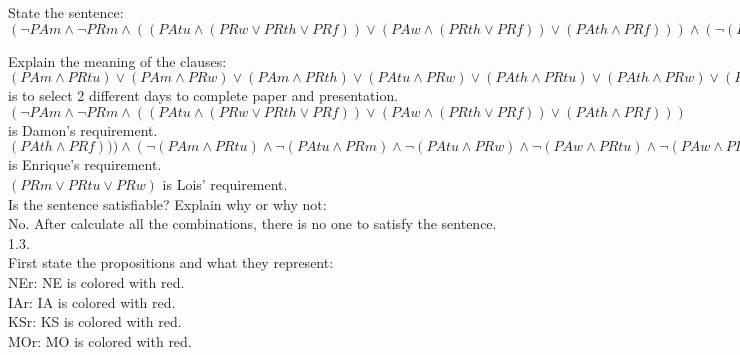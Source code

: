 \documentclass[a4paper]{article}
\begin{document}
State the sentence:\\
$(\neg PAm\wedge \neg PRm\wedge ((PAtu\wedge (PRw\vee PRth\vee PRf))\vee (PAw\wedge (PRth\vee PRf))\vee (PAth\wedge PRf)))\wedge (\neg (PAm\wedge PRtu)\wedge \neg (PAtu\wedge PRm)\wedge \neg (PAtu\wedge PRw)\wedge \neg (PAw\wedge PRtu)\wedge \neg (PAw\wedge PRth)\wedge \neg (PAth\wedge PRw)\wedge \neg (PAth\wedge PRf)\wedge \neg (PAf\wedge PRth))\wedge (PRm\vee PRtu\vee PRw) \wedge ((PAm \wedge PRtu)\vee (PAm \wedge PRw)\vee (PAm \wedge PRth)\vee (PAtu \wedge PRw)\vee (PAth \wedge PRtu)\vee (PAth \wedge PRw)\vee (PAf \wedge PRm)\vee (PAf \wedge PRtu)\vee (PAf \wedge PRw)\vee (PAf \wedge PRth)\vee (PRm \wedge PAtu)\vee (PRm \wedge PAw)\vee (PRm \wedge PAth)\vee (PRtu \wedge PAw)\vee (PRth \wedge PAtu)\vee (PRth \wedge PAw)\vee (PRf \wedge PAm)\vee (PRf \wedge PAtu)\vee (PRf \wedge PAw)\vee (PRf \wedge PAth))$

Explain the meaning of the clauses:\\
$(PAm \wedge PRtu)\vee (PAm \wedge PRw)\vee (PAm \wedge PRth)\vee (PAtu \wedge PRw)\vee (PAth \wedge PRtu)\vee (PAth \wedge PRw)\vee (PAf \wedge PRm)\vee (PAf \wedge PRtu)\vee (PAf \wedge PRw)\vee (PAf \wedge PRth)\vee (PRm \wedge PAtu)\vee (PRm \wedge PAw)\vee (PRm \wedge PAth)\vee (PRtu \wedge PAw)\vee (PRth \wedge PAtu)\vee (PRth \wedge PAw)\vee (PRf \wedge PAm)\vee (PRf \wedge PAtu)\vee (PRf \wedge PAw)\vee (PRf \wedge PAth)$ is to select 2 different days to complete paper and presentation.\\
$(\neg PAm\wedge \neg PRm\wedge ((PAtu\wedge (PRw\vee PRth\vee PRf))\vee (PAw\wedge (PRth\vee PRf))\vee (PAth\wedge PRf)))$ is Damon's requirement.\\
$(PAth\wedge PRf)))\wedge (\neg (PAm\wedge PRtu)\wedge \neg (PAtu\wedge PRm)\wedge \neg (PAtu\wedge PRw)\wedge \neg (PAw\wedge PRtu)\wedge \neg (PAw\wedge PRth)\wedge \neg (PAth\wedge PRw)\wedge \neg (PAth\wedge PRf)\wedge \neg (PAf\wedge PRth))$ is Enrique's requirement.\\
$(PRm\vee PRtu\vee PRw)$ is Lois' requirement.\\

Is the sentence satisfiable? Explain why or why not:\\
No. After calculate all the combinations, there is no one to satisfy the sentence.\\

1.3.\\
First state the propositions and what they represent:\\
NEr: NE is colored with red.\\
IAr: IA is colored with red.\\
KSr: KS is colored with red.\\
MOr: MO is colored with red.\\
\end{document}
